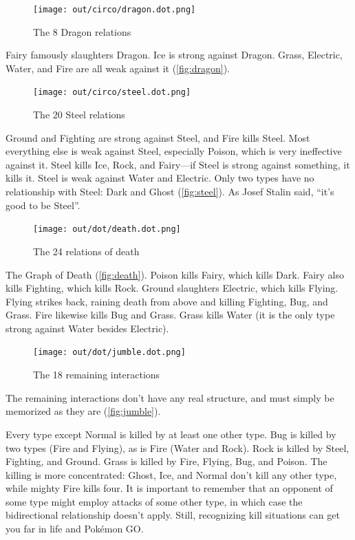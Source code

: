 \begin{figure}[t!]
\centering
\texttt{[image: out/circo/dragon.dot.png]}
\caption{The 8 Dragon relations\label{fig:dragon}}
\end{figure}
\noindent{}Fairy famously slaughters Dragon.
Ice is strong against Dragon.
Grass, Electric, Water, and Fire are all weak against it (\autoref{fig:dragon}).

\begin{figure}[h!]
\centering
\texttt{[image: out/circo/steel.dot.png]}
\caption{The 20 Steel relations\label{fig:steel}}
\end{figure}
\noindent{}Ground and Fighting are strong against Steel, and Fire kills Steel.
Most everything else is weak against Steel, especially
 Poison, which is very ineffective against it.
Steel kills Ice, Rock, and Fairy---if Steel is strong against something, it kills it.
Steel is weak against Water and Electric.
Only two types have no relationship with Steel: Dark and Ghost (\autoref{fig:steel}).
As Josef Stalin said, ``it's good to be Steel''.

\begin{figure}[h!]
\centering
\texttt{[image: out/dot/death.dot.png]}
\caption{The 24 relations of death\label{fig:death}}
\end{figure}
\noindent{}The Graph of Death (\autoref{fig:death}).
Poison kills Fairy, which kills Dark.
Fairy also kills Fighting, which kills Rock.
Ground slaughters Electric, which kills Flying.
Flying strikes back, raining death from above and killing Fighting, Bug, and Grass.
Fire likewise kills Bug and Grass.
Grass kills Water (it is the only type strong against Water besides Electric).

\begin{figure}[ht]
\centering
\texttt{[image: out/dot/jumble.dot.png]}
\caption{The 18 remaining interactions\label{fig:jumble}}
\end{figure}
\noindent{}The remaining interactions don't have any real structure, and must simply be
memorized as they are (\autoref{fig:jumble}).

Every type except Normal is killed by at least one other type.
Bug is killed by two types (Fire and Flying), as is Fire (Water and Rock).
Rock is killed by Steel, Fighting, and Ground.
Grass is killed by Fire, Flying, Bug, and Poison.
The killing is more concentrated: Ghost, Ice, and Normal don't kill
  any other type, while mighty Fire kills four.
It is important to remember that an opponent of some type might
  employ attacks of some other type, in which case the bidirectional
  relationship doesn't apply.
Still, recognizing kill situations can get you
  far in life and Pokémon GO\@.


